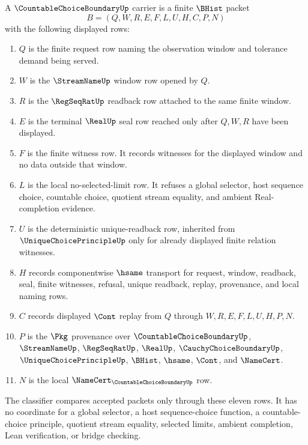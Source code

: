 \begin{definition}
\label{def:countable-choice-boundary-carrier}
A $\CountableChoiceBoundaryUp$ carrier is a finite $\BHist$ packet
$$
B=(Q,W,R,E,F,L,U,H,C,P,N)
$$
with the following displayed rows:
\begin{enumerate}
\item $Q$ is the finite request row naming the observation window and tolerance demand being served.
\item $W$ is the $\StreamNameUp$ window row opened by $Q$.
\item $R$ is the $\RegSeqRatUp$ readback row attached to the same finite window.
\item $E$ is the terminal $\RealUp$ seal row reached only after $Q,W,R$ have been displayed.
\item $F$ is the finite witness row. It records witnesses for the displayed window and no data outside that window.
\item $L$ is the local no-selected-limit row. It refuses a global selector, host sequence choice, countable choice, quotient stream equality, and ambient Real-completion evidence.
\item $U$ is the deterministic unique-readback row, inherited from $\UniqueChoicePrincipleUp$ only for already displayed finite relation witnesses.
\item $H$ records componentwise $\hsame$ transport for request, window, readback, seal, finite witnesses, refusal, unique readback, replay, provenance, and local naming rows.
\item $C$ records displayed $\Cont$ replay from $Q$ through $W,R,E,F,L,U,H,P,N$.
\item $P$ is the $\Pkg$ provenance over $\CountableChoiceBoundaryUp$, $\StreamNameUp$, $\RegSeqRatUp$, $\RealUp$, $\CauchyChoiceBoundaryUp$, $\UniqueChoicePrincipleUp$, $\BHist$, $\hsame$, $\Cont$, and $\NameCert$.
\item $N$ is the local $\NameCert_{\CountableChoiceBoundaryUp}$ row.
\end{enumerate}
The classifier compares accepted packets only through these eleven rows. It has no coordinate for a global selector, a host sequence-choice function, a countable-choice principle, quotient stream equality, selected limits, ambient completion, Lean verification, or bridge checking.
\end{definition}

